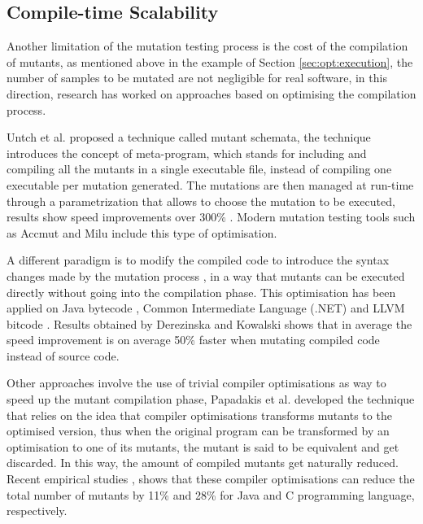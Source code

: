
\subsection{Compile-time Scalability}
\label{sub:compileTime}
\label{sec:opt:selection}

Another limitation of the mutation testing process is the cost of the compilation of mutants, as mentioned above in the example of Section \ref{sec:opt:execution}, the number of samples to be mutated are not negligible for real software, in this direction, research has worked on approaches based on optimising the compilation process.

Untch et al. \cite{untch1993mutation} proposed a technique called mutant schemata, the technique introduces the concept of meta-program, which stands for including and compiling all the mutants in a single executable file, instead of compiling one executable per mutation generated. The mutations are then managed at run-time through a parametrization that allows to choose the mutation to be executed, results show speed improvements over 300\% \cite{untch1993mutation,papadakis2010automatic}. Modern mutation testing tools such as Accmut \cite{wang2017faster} and Milu \cite{jia2008milu} include this type of optimisation.

A different paradigm is to modify the compiled code to introduce the syntax changes made by the mutation process \cite{ma2006mujava}, in a way that mutants can be executed directly without going into the compilation phase. This optimisation has been applied on Java bytecode \cite{ma2006mujava}, Common Intermediate Language (.NET) \cite{derezinska2011object} and LLVM bitcode \cite{hariri2016evaluating}. Results obtained by Derezinska and Kowalski \cite{derezinska2011object} shows that in average the speed improvement is on average 50\% faster when mutating compiled code instead of source code.

Other approaches involve the use of trivial compiler optimisations \cite{papadakis2015trivial,kintis2017detecting} as way to speed up the mutant compilation phase, Papadakis et al. \cite{papadakis2015trivial, kintis2017detecting} developed the technique that relies on the idea that compiler optimisations transforms mutants to the optimised version, thus when the original program can be transformed by an optimisation to one of its mutants, the mutant is said to be equivalent and get discarded. In this way, the amount of compiled mutants get naturally reduced. Recent empirical studies \cite{kintis2017detecting}, shows that these compiler optimisations can reduce the total number of mutants by 11\% and 28\% for Java and C programming language, respectively.



